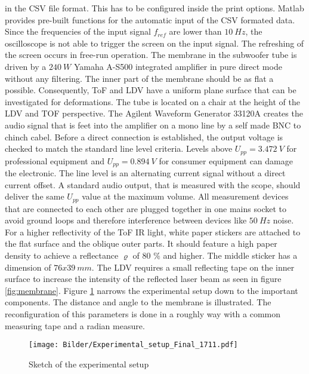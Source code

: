 in the CSV file format. This has to be configured inside the print options. Matlab provides pre-built functions for the automatic input of the CSV formated data.  Since the frequencies of the input signal $f_{ref}$ are lower than $10~Hz$, the oscilloscope is not able to trigger the screen on the input signal. The refreshing of the screen occurs in free-run operation. 
The membrane in the subwoofer tube is driven by a $240~W$ Yamaha A-S500 integrated amplifier in pure direct mode without any filtering. The inner part of the membrane should be as flat a possible. Consequently, ToF and LDV have a uniform plane surface that can be investigated for deformations. The tube is located on a chair at the height of the LDV and TOF perspective. The Agilent Waveform Generator 33120A creates the audio signal that is feet into the amplifier on a mono line by a self made BNC to chinch cabel. Before a direct connection is established, the output voltage is checked to match the standard line level criteria. Levels above $U_{pp}=3.472~V$ for professional equipment and $U_{pp}=0.894~V$ for consumer equipment can damage the electronic. The line level is an alternating current signal without a direct current offset. A standard audio output, that is measured with the scope, should deliver the same $U_{pp}$ value at the maximum volume. All measurement devices that are connected to each other are plugged together in one mains socket to avoid ground loops and therefore interference between devices like $50~Hz$ noise. For a higher reflectivity of the ToF IR light, white paper stickers are attached to the flat surface and the oblique outer parts. It should feature a high paper density to achieve a reflectance $\varrho$ of 80 $\%$ and higher. The middle sticker has a dimension of $76x39~mm$. The LDV requires a small reflecting tape on the inner surface to increase the intensity of the reflected laser beam as seen in figure \ref{fig:membrane}. Figure \ref{fig:experimental_setup} narrows the experimental setup down to the important components. The distance and angle to the membrane is illustrated. The reconfiguration of this parameters is done in a roughly way with a common measuring tape and a radian measure. 
\bigskip
\begin{figure}[!h]   
	\centering
	\texttt{[image: Bilder/Experimental\_setup\_Final\_1711.pdf]}
	\caption{Sketch of the experimental setup}
	\label{fig:experimental_setup} 
\end{figure}     

